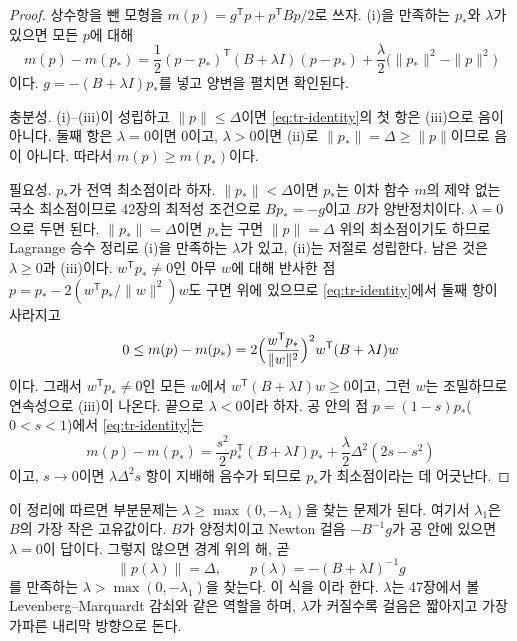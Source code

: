 \begin{proof}
상수항을 뺀 모형을 $m(p)=g^{\mathsf T}p+p^{\mathsf T}Bp/2$로 쓰자. (i)을 만족하는 $p_\ast$와 $\lambda$가 있으면 모든 $p$에 대해
\begin{equation}
m(p)-m(p_\ast)=\frac12(p-p_\ast)^{\mathsf T}(B+\lambda I)(p-p_\ast)+\frac\lambda2\bigl(\|p_\ast\|^2-\|p\|^2\bigr)
\label{eq:tr-identity}
\end{equation}
이다. $g=-(B+\lambda I)p_\ast$를 넣고 양변을 펼치면 확인된다.

충분성. (i)--(iii)이 성립하고 $\|p\|\le\Delta$이면 \eqref{eq:tr-identity}의 첫 항은 (iii)으로 음이 아니다. 둘째 항은 $\lambda=0$이면 $0$이고, $\lambda>0$이면 (ii)로 $\|p_\ast\|=\Delta\ge\|p\|$이므로 음이 아니다. 따라서 $m(p)\ge m(p_\ast)$이다.

필요성. $p_\ast$가 전역 최소점이라 하자. $\|p_\ast\|<\Delta$이면 $p_\ast$는 이차 함수 $m$의 제약 없는 국소 최소점이므로 42장의 최적성 조건으로 $Bp_\ast=-g$이고 $B$가 양반정치이다. $\lambda=0$으로 두면 된다. $\|p_\ast\|=\Delta$이면 $p_\ast$는 구면 $\|p\|=\Delta$ 위의 최소점이기도 하므로 Lagrange 승수 정리로 (i)을 만족하는 $\lambda$가 있고, (ii)는 저절로 성립한다. 남은 것은 $\lambda\ge0$과 (iii)이다. $w^{\mathsf T}p_\ast\ne0$인 아무 $w$에 대해 반사한 점 $p=p_\ast-2(w^{\mathsf T}p_\ast/\|w\|^2)w$도 구면 위에 있으므로 \eqref{eq:tr-identity}에서 둘째 항이 사라지고
\[
0\le m(p)-m(p_\ast)=2\Bigl(\frac{w^{\mathsf T}p_\ast}{\|w\|^2}\Bigr)^2w^{\mathsf T}(B+\lambda I)w
\]
이다. 그래서 $w^{\mathsf T}p_\ast\ne0$인 모든 $w$에서 $w^{\mathsf T}(B+\lambda I)w\ge0$이고, 그런 $w$는 조밀하므로 연속성으로 (iii)이 나온다. 끝으로 $\lambda<0$이라 하자. 공 안의 점 $p=(1-s)p_\ast$($0<s<1$)에서 \eqref{eq:tr-identity}는
\[
m(p)-m(p_\ast)=\frac{s^2}2p_\ast^{\mathsf T}(B+\lambda I)p_\ast+\frac\lambda2\Delta^2(2s-s^2)
\]
이고, $s\to0$이면 $\lambda\Delta^2s$ 항이 지배해 음수가 되므로 $p_\ast$가 최소점이라는 데 어긋난다.
\end{proof}

이 정리\cite{more1983trust,gay1981,sorensen1982trust}에 따르면 부분문제는 $\lambda\ge\max(0,-\lambda_1)$을 찾는 문제가 된다. 여기서 $\lambda_1$은 $B$의 가장 작은 고유값이다. $B$가 양정치이고 Newton 걸음 $-B^{-1}g$가 공 안에 있으면 $\lambda=0$이 답이다. 그렇지 않으면 경계 위의 해, 곧
\[
\|p(\lambda)\|=\Delta,\qquad p(\lambda)=-(B+\lambda I)^{-1}g
\]
를 만족하는 $\lambda>\max(0,-\lambda_1)$을 찾는다. 이 식을 이라 한다. $\lambda$는 47장에서 볼 Levenberg--Marquardt 감쇠와 같은 역할을 하며, $\lambda$가 커질수록 걸음은 짧아지고 가장 가파른 내리막 방향으로 돈다.

